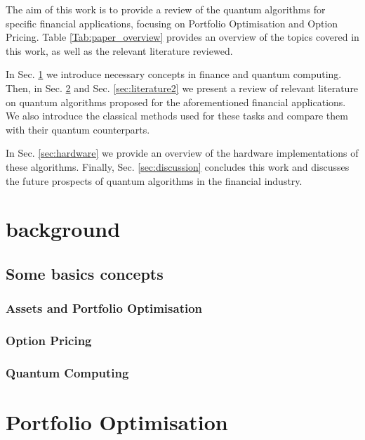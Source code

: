 \documentclass[prx,twocolumn,floatfix,superscriptaddress,longbibliography]{revtex4-1}
\begin{document}
The aim of this work is to provide a review of the quantum algorithms for specific financial applications, focusing on Portfolio Optimisation and Option Pricing. Table \ref{Tab:paper_overview} provides an overview of the topics covered in this work, as well as the relevant literature reviewed. 

In Sec. \ref{sec:background} we introduce necessary concepts in finance and quantum computing. Then, in Sec. \ref{sec:literature1} and Sec. \ref{sec:literature2}  we present a review of relevant literature on quantum algorithms proposed for the aforementioned financial applications. We also 
  introduce the classical methods used for these tasks and compare them with their quantum counterparts.

In Sec. \ref{sec:hardware} we provide an overview of the hardware implementations of these algorithms. Finally, Sec. \ref{sec:discussion} concludes this work and discusses the future prospects of quantum algorithms in the financial industry.




\section{background}\label{sec:background}



\subsection{Some basics concepts}

\subsubsection{Assets and Portfolio Optimisation}

\subsubsection{Option Pricing}

\subsubsection{Quantum Computing}


\section{Portfolio Optimisation}\label{sec:literature1}
\end{document}
